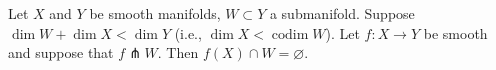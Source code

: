 Let $X$ and $Y$ be smooth manifolds, $W \subset Y$ a submanifold. Suppose $\dim W + \dim X < \dim Y$ (i.e., $\dim X < \operatorname{codim} W$). Let $f: X \to Y$ be smooth and suppose that $f \pitchfork W$. Then $f(X) \cap W = \varnothing$.